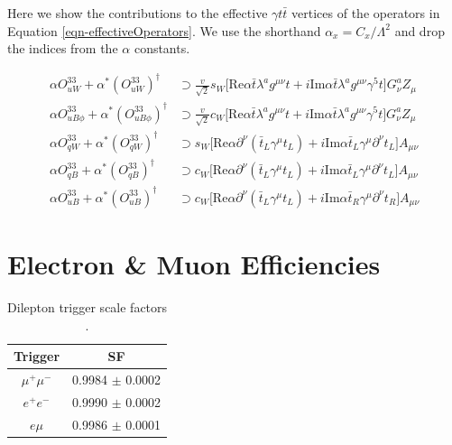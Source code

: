 \documentclass[oneside, a4paper, 11pt, ]{report}
\begin{document}
Here we show the contributions to the effective $\gamma t \bar{t}$ vertices of the operators in Equation \ref{eqn-effectiveOperators}. We use the shorthand $\alpha_x = C_x/\Lambda^2$ and drop the indices from the $\alpha$ constants.

\begin{align}
\alpha O^{33}_{uW} + \alpha^* (O^{33}_{uW})^{\dagger} & \supset \frac{v}{\sqrt{2}}s_W \lbrack \text{Re} \alpha\bar{t}\lambda^a g^{\mu \nu} t + i \text{Im} \alpha \bar{t}\lambda^a g^{\mu \nu} \gamma^5 t\rbrack G^a_{\nu} Z_{\mu}\\ 
\alpha O^{33}_{uB\phi} + \alpha^* (O^{33}_{uB\phi})^{\dagger} & \supset \frac{v}{\sqrt{2}}c_W \lbrack \text{Re} \alpha\bar{t}\lambda^a g^{\mu \nu} t + i \text{Im} \alpha \bar{t}\lambda^a g^{\mu \nu} \gamma^5 t\rbrack G^a_{\nu} Z_{\mu}\\ 
\alpha O^{33}_{qW} + \alpha^* (O^{33}_{qW})^{\dagger} & \supset s_W \lbrack \text{Re} \alpha\partial^{\nu}(\bar{t}_L\gamma^{\mu}t_L) + i \text{Im} \alpha \bar{t}_L\gamma^{\mu}\partial^{\nu}t_L \rbrack A_{\mu \nu}\\ 
\alpha O^{33}_{qB} + \alpha^* (O^{33}_{qB})^{\dagger} & \supset c_W \lbrack \text{Re} \alpha\partial^{\nu}(\bar{t}_L\gamma^{\mu}t_L) + i \text{Im} \alpha \bar{t}_L\gamma^{\mu}\partial^{\nu}t_L \rbrack A_{\mu \nu}\\ 
\alpha O^{33}_{uB} + \alpha^* (O^{33}_{uB})^{\dagger} & \supset c_W \lbrack \text{Re} \alpha\partial^{\nu}(\bar{t}_L\gamma^{\mu}t_L) + i \text{Im} \alpha \bar{t}_R\gamma^{\mu}\partial^{\nu}t_R \rbrack A_{\mu \nu}  
\end{align}

\section{Electron \& Muon Efficiencies}

\begin{table} 
\begin{center}
\begin{tabular}{|c|c|}
\hline
	\textbf{Trigger} & \textbf{SF} \\
\hline	
	$\mu^+\mu^-$ & 0.9984 $\pm$ 0.0002 \\
	$e^+e^-$ & 0.9990 $\pm$ 0.0002 \\
	$e\mu$ & 0.9986 $\pm$ 0.0001 \\
\hline	
\end{tabular}
\end{center}
\caption{Dilepton trigger scale factors \cite{}.}
\label{tab-leptonTriggerSFs}
\end{table}
\end{document}
